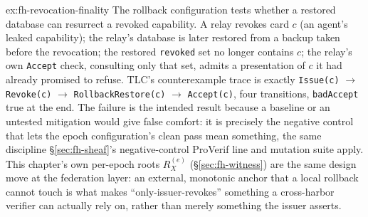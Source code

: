 \documentclass[11pt,a4paper]{article}
\theoremstyle{definition}
\theoremstyle{remark}
\begin{document}
\begin{pdsolution}{ex:fh-revocation-finality}
The rollback configuration tests whether a restored database can resurrect a revoked capability. A relay revokes card $c$ (an agent's leaked capability); the relay's database is later restored from a backup taken before the revocation; the restored \texttt{revoked} set no longer contains $c$; the relay's own \texttt{Accept} check, consulting only that set, admits a presentation of $c$ it had already promised to refuse. TLC's counterexample trace is exactly \texttt{Issue(c)} $\to$ \texttt{Revoke(c)} $\to$ \texttt{RollbackRestore(c)} $\to$ \texttt{Accept(c)}, four transitions, \texttt{badAccept} true at the end. The failure is the intended result because a baseline or an untested mitigation would give false comfort: it is precisely the negative control that lets the epoch configuration's clean pass mean something, the same discipline \S\ref{sec:fh-sheaf}'s negative-control ProVerif line and mutation suite apply. This chapter's own per-epoch roots $R_X^{(e)}$ (\S\ref{sec:fh-witness}) are the same design move at the federation layer: an external, monotonic anchor that a local rollback cannot touch is what makes ``only-issuer-revokes'' something a cross-harbor verifier can actually rely on, rather than merely something the issuer asserts.
\end{pdsolution}
\end{document}
